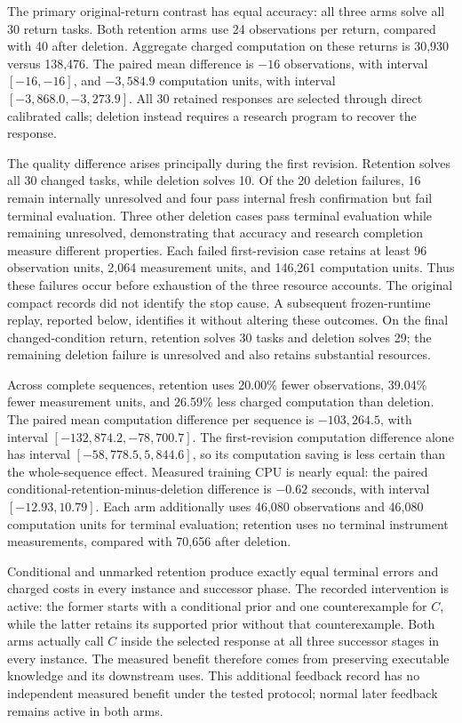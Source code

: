 \documentclass[11pt,a4paper]{article}
\begin{document}
The primary original-return contrast has equal accuracy: all three arms solve all 30 return tasks. Both retention arms use 24 observations per return, compared with 40 after deletion. Aggregate charged computation on these returns is 30,930 versus 138,476. The paired mean difference is \(-16\) observations, with interval \([-16,-16]\), and \(-3{,}584.9\) computation units, with interval \([-3{,}868.0,-3{,}273.9]\). All 30 retained responses are selected through direct calibrated calls; deletion instead requires a research program to recover the response.


The quality difference arises principally during the first revision. Retention solves all 30 changed tasks, while deletion solves 10. Of the 20 deletion failures, 16 remain internally unresolved and four pass internal fresh confirmation but fail terminal evaluation. Three other deletion cases pass terminal evaluation while remaining unresolved, demonstrating that accuracy and research completion measure different properties. Each failed first-revision case retains at least 96 observation units, 2,064 measurement units, and 146,261 computation units. Thus these failures occur before exhaustion of the three resource accounts. The original compact records did not identify the stop cause. A subsequent frozen-runtime replay, reported below, identifies it without altering these outcomes. On the final changed-condition return, retention solves 30 tasks and deletion solves 29; the remaining deletion failure is unresolved and also retains substantial resources.


Across complete sequences, retention uses 20.00\% fewer observations, 39.04\% fewer measurement units, and 26.59\% less charged computation than deletion. The paired mean computation difference per sequence is \(-103{,}264.5\), with interval \([-132{,}874.2,-78{,}700.7]\). The first-revision computation difference alone has interval \([-58{,}778.5,5{,}844.6]\), so its computation saving is less certain than the whole-sequence effect. Measured training CPU is nearly equal: the paired conditional-retention-minus-deletion difference is \(-0.62\) seconds, with interval \([-12.93,10.79]\). Each arm additionally uses 46,080 observations and 46,080 computation units for terminal evaluation; retention uses no terminal instrument measurements, compared with 70,656 after deletion.


Conditional and unmarked retention produce exactly equal terminal errors and charged costs in every instance and successor phase. The recorded intervention is active: the former starts with a conditional prior and one counterexample for \(C\), while the latter retains its supported prior without that counterexample. Both arms actually call \(C\) inside the selected response at all three successor stages in every instance. The measured benefit therefore comes from preserving executable knowledge and its downstream uses. This additional feedback record has no independent measured benefit under the tested protocol; normal later feedback remains active in both arms.
\end{document}
